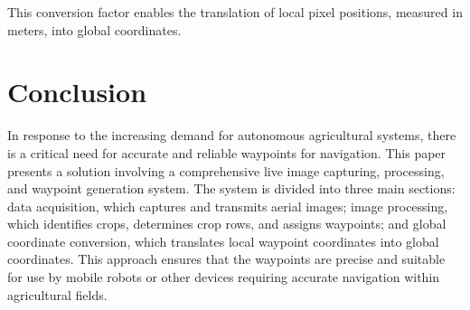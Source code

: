 \documentclass[conference]{IEEEtran}
\begin{document}
This conversion factor enables the translation of local pixel positions, measured in meters, into global coordinates.

\section{Conclusion}
In response to the increasing demand for autonomous agricultural systems, there is a critical need for accurate and reliable waypoints for navigation. This paper presents a solution involving a comprehensive live image capturing, processing, and waypoint generation system. The system is divided into three main sections: data acquisition, which captures and transmits aerial images; image processing, which identifies crops, determines crop rows, and assigns waypoints; and global coordinate conversion, which translates local waypoint coordinates into global coordinates. This approach ensures that the waypoints are precise and suitable for use by mobile robots or other devices requiring accurate navigation within agricultural fields.
\end{document}
